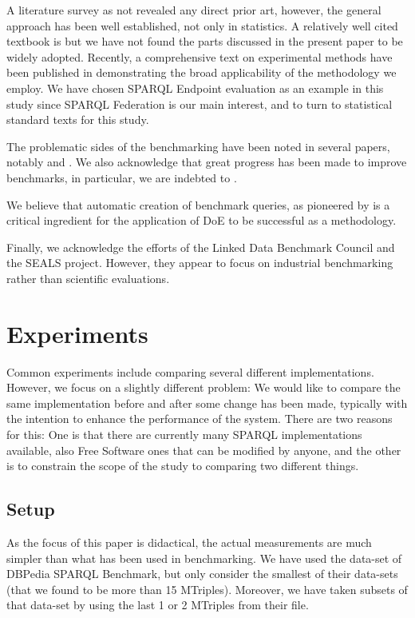 \documentclass{llncs}
\begin{document}
A literature survey as not revealed any direct prior art, however, the
general approach has been well established, not only in statistics. A
relatively well cited textbook is \cite{citeulike:5190414} but we have
not found the parts discussed in the present paper to be widely
adopted. Recently, a comprehensive text on experimental methods have
been published in
\cite{Springer-2010-Experimental-Methods-for-the-Analysis-of-Optimization-Algorithms}
demonstrating the broad applicability of the methodology we employ.
We have chosen SPARQL Endpoint evaluation as an example in this study
since SPARQL Federation is our main interest, and to turn to
statistical standard texts \cite{wu2009experiments} for this study.

The problematic sides of the benchmarking have been noted in several
papers, notably \cite{Duan:2011:AOC:1989323.1989340} and
\cite{MontoyaVCRA12}. We also acknowledge that great
progress has been made to improve benchmarks, in particular, we are
indebted to \cite{mxro:Morsey2011DBpedia}. 

We believe that automatic creation of benchmark queries, as
pioneered by \cite{goerlitz2012splodge} is a critical ingredient for
the application of DoE to be successful as a methodology.

Finally, we acknowledge the efforts of the Linked Data Benchmark
Council and the SEALS project. However, they appear to focus on
industrial benchmarking rather than scientific evaluations. 

\section{Experiments}

Common experiments include comparing several different
implementations. However, we focus on a slightly different problem: We
would like to compare the same implementation before and after some
change has been made, typically with the intention to enhance the
performance of the system. There are two reasons for this: One is that
there are currently many SPARQL implementations available, also Free
Software ones that can be modified by anyone, and the other is to
constrain the scope of the study to comparing two different things.

\subsection{Setup}

As the focus of this paper is didactical, the actual measurements are
much simpler than what has been used in benchmarking. We have used the
data-set of DBPedia SPARQL Benchmark\cite{mxro:Morsey2011DBpedia}, but only consider the
smallest of their data-sets (that we found to be more than 15
MTriples). Moreover, we have taken subsets of that data-set by using
the last 1 or 2 MTriples from their file.
\end{document}
